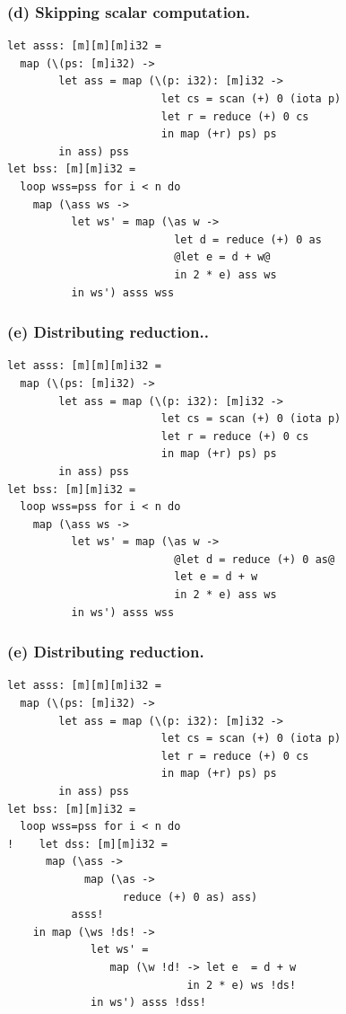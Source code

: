 \documentclass[rgb,dvipsnames]{beamer}
\begin{document}
\begin{frame}[t,fragile]
\frametitle{(d) Skipping scalar computation.}

\begin{lstlisting}[basicstyle=\sffamily\footnotesize]
let asss: [m][m][m]i32 =
  map (\(ps: [m]i32) ->
        let ass = map (\(p: i32): [m]i32 ->
                        let cs = scan (+) 0 (iota p)
                        let r = reduce (+) 0 cs
                        in map (+r) ps) ps
        in ass) pss
let bss: [m][m]i32 =
  loop wss=pss for i < n do
    map (\ass ws ->
          let ws' = map (\as w ->
                          let d = reduce (+) 0 as
                          @let e = d + w@
                          in 2 * e) ass ws
          in ws') asss wss
\end{lstlisting}
\end{frame}

\begin{frame}[t,fragile]
\frametitle{(e) Distributing reduction..}

\begin{lstlisting}[basicstyle=\sffamily\footnotesize]
let asss: [m][m][m]i32 =
  map (\(ps: [m]i32) ->
        let ass = map (\(p: i32): [m]i32 ->
                        let cs = scan (+) 0 (iota p)
                        let r = reduce (+) 0 cs
                        in map (+r) ps) ps
        in ass) pss
let bss: [m][m]i32 =
  loop wss=pss for i < n do
    map (\ass ws ->
          let ws' = map (\as w ->
                          @let d = reduce (+) 0 as@
                          let e = d + w
                          in 2 * e) ass ws
          in ws') asss wss
\end{lstlisting}
\end{frame}

\begin{frame}[t,fragile]
\frametitle{(e) Distributing reduction.}

\begin{lstlisting}[basicstyle=\sffamily\footnotesize]
let asss: [m][m][m]i32 =
  map (\(ps: [m]i32) ->
        let ass = map (\(p: i32): [m]i32 ->
                        let cs = scan (+) 0 (iota p)
                        let r = reduce (+) 0 cs
                        in map (+r) ps) ps
        in ass) pss
let bss: [m][m]i32 =
  loop wss=pss for i < n do
!    let dss: [m][m]i32 =
      map (\ass ->
            map (\as ->
                  reduce (+) 0 as) ass)
          asss!
    in map (\ws !ds! ->
             let ws' =
                map (\w !d! -> let e  = d + w
                            in 2 * e) ws !ds!
             in ws') asss !dss!
\end{lstlisting}
\end{frame}
\end{document}
